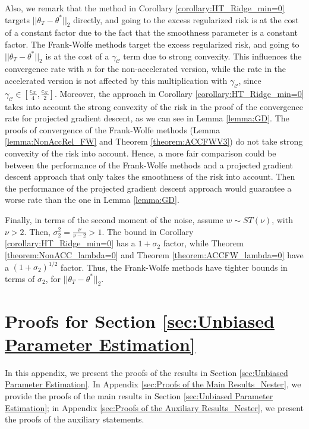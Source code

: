 \documentclass{article}
\begin{document}
Also, we remark that the method in Corollary \ref{corollary:HT_Ridge_min=0} targets $||\theta_T - \theta^*||_2$ directly, and going to the excess regularized risk is at the cost of a constant factor due to the fact that the smoothness parameter is a constant factor. The Frank-Wolfe methods target the excess regularized risk, and going to $||\theta_T - \theta^*||_2$ is at the cost of a $\gamma_{\mathcal{C}}$ term due to strong convexity. This influences the convergence rate with $n$ for the non-accelerated version, while the rate in the accelerated version is not affected by this multiplication with $\gamma_{\mathcal{C}}$, since $\gamma_{\mathcal{C}} \in \left[\frac{c_{\mathcal{K}}}{4}, \frac{c_{\mathcal{K}}}{2}\right]$. Moreover, the approach in Corollary \ref{corollary:HT_Ridge_min=0} takes into account the strong convexity of the risk in the proof of the convergence rate for projected gradient descent, as we can see in Lemma \ref{lemma:GD}. The proofs of convergence of the Frank-Wolfe methods (Lemma \ref{lemma:NonAccRel_FW} and Theorem \ref{theorem:ACCFWV3}) do not take strong convexity of the risk into account. Hence, a more fair comparison could be between the performance of the Frank-Wolfe methods and a projected gradient descent approach that only takes the smoothness of the risk into account. Then the performance of the projected gradient descent approach would guarantee a worse rate than the one in Lemma \ref{lemma:GD}.

Finally, in terms of the second moment of the noise, assume $w \sim ST(\nu)$, with $\nu > 2$. Then, $\sigma_2^2 = \frac{\nu}{\nu - 2} > 1$. The bound in Corollary \ref{corollary:HT_Ridge_min=0} has a $1 + \sigma_2$ factor, while Theorem \ref{theorem:NonACC_lambda=0} and Theorem \ref{theorem:ACCFW_lambda=0} have a $(1 + \sigma_2)^{1/2}$ factor. Thus, the Frank-Wolfe methods have tighter bounds in terms of $\sigma_2$, for $||\theta_T - \theta^*||_2$.


\section{Proofs for Section \ref{sec:Unbiased Parameter Estimation}}

In this appendix, we present the proofs of the results in Section \ref{sec:Unbiased Parameter Estimation}. In Appendix \ref{sec:Proofs of the Main Results_Nester}, we provide the proofs of the main results in Section \ref{sec:Unbiased Parameter Estimation}; in Appendix \ref{sec:Proofs of the Auxiliary Results_Nester}, we present the proofs of the auxiliary statements.
\end{document}

